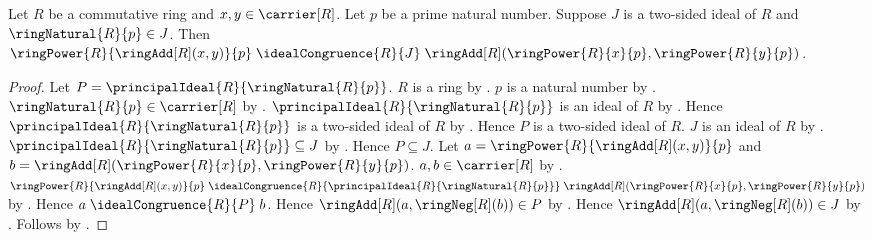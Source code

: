 \begin{corollary}\label{freshmans_dream_mod_ideal}
    Let $R$ be a commutative ring and $x,y\in\carrier[R]$.
    Let $p$ be a prime natural number.
    Suppose $J$ is a two-sided ideal of $R$ and
        $\ringNatural{R}{p}\in J$.
    Then
        $\ringPower{R}{\ringAdd[R](x,y)}{p}
            \mathrel{\idealCongruence{R}{J}}
        \ringAdd[R](\ringPower{R}{x}{p},\ringPower{R}{y}{p})$.
\end{corollary}
\begin{proof}
    Let $P=\principalIdeal{R}{\ringNatural{R}{p}}$.
    $R$ is a ring by .
    $p$ is a natural number by .
    $\ringNatural{R}{p}\in\carrier[R]$ by
        .
    $\principalIdeal{R}{\ringNatural{R}{p}}$ is an ideal of $R$ by
        .
    Hence $\principalIdeal{R}{\ringNatural{R}{p}}$
        is a two-sided ideal of $R$ by .
    Hence $P$ is a two-sided ideal of $R$.
    $J$ is an ideal of $R$ by .
    $\principalIdeal{R}{\ringNatural{R}{p}}\subseteq J$ by
        .
    Hence $P\subseteq J$.
    Let $a=\ringPower{R}{\ringAdd[R](x,y)}{p}$ and
        $b=\ringAdd[R](\ringPower{R}{x}{p},\ringPower{R}{y}{p})$.
    $a,b\in\carrier[R]$ by
        .
    $\ringPower{R}{\ringAdd[R](x,y)}{p}
        \mathrel{\idealCongruence{R}{
            \principalIdeal{R}{\ringNatural{R}{p}}}}
        \ringAdd[R](\ringPower{R}{x}{p},\ringPower{R}{y}{p})$ by
        .
    Hence $a\mathrel{\idealCongruence{R}{P}}b$.
    Hence $\ringAdd[R](a,\ringNeg[R](b))\in P$ by
        .
    Hence $\ringAdd[R](a,\ringNeg[R](b))\in J$ by
        .
    Follows by .
\end{proof}


